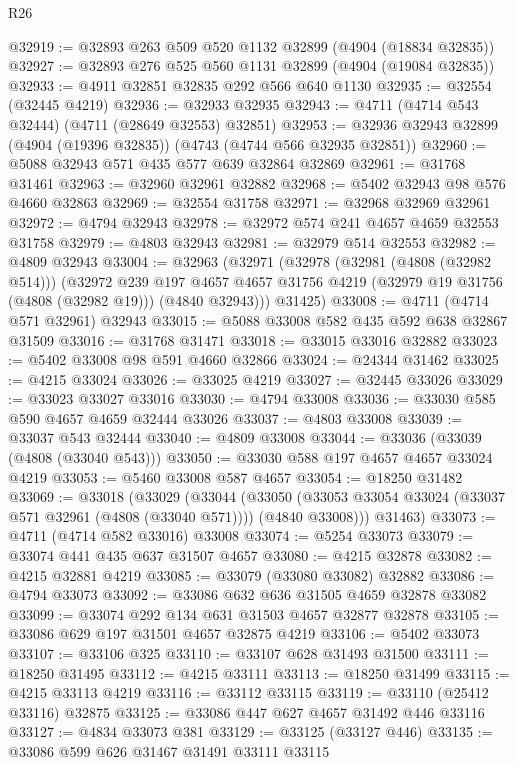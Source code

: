 \begin{lexlean}{R26}
\begin{coremodule}
@32919 := @32893 @263 @509 @520 @1132 @32899 (@4904 (@18834 @32835))
@32927 := @32893 @276 @525 @560 @1131 @32899 (@4904 (@19084 @32835))
@32933 := @4911 @32851 @32835 @292 @566 @640 @1130
@32935 := @32554 (@32445 @4219)
@32936 := @32933 @32935
@32943 := @4711 (@4714 @543 @32444) (@4711 (@28649 @32553) @32851)
@32953 := @32936 @32943 @32899 (@4904 (@19396 @32835)) (@4743 (@4744 @566 @32935 @32851))
@32960 := @5088 @32943 @571 @435 @577 @639 @32864 @32869
@32961 := @31768 @31461
@32963 := @32960 @32961 @32882
@32968 := @5402 @32943 @98 @576 @4660 @32863
@32969 := @32554 @31758
@32971 := @32968 @32969 @32961
@32972 := @4794 @32943
@32978 := @32972 @574 @241 @4657 @4659 @32553 @31758
@32979 := @4803 @32943
@32981 := @32979 @514 @32553
@32982 := @4809 @32943
@33004 := @32963
    (@32971
      (@32978
        (@32981 (@4808 (@32982 @514)))
        (@32972
          @239
          @197
          @4657
          @4657
          @31756
          @4219
          (@32979 @19 @31756 (@4808 (@32982 @19)))
          (@4840 @32943)))
      @31425)
@33008 := @4711 (@4714 @571 @32961) @32943
@33015 := @5088 @33008 @582 @435 @592 @638 @32867 @31509
@33016 := @31768 @31471
@33018 := @33015 @33016 @32882
@33023 := @5402 @33008 @98 @591 @4660 @32866
@33024 := @24344 @31462
@33025 := @4215 @33024
@33026 := @33025 @4219
@33027 := @32445 @33026
@33029 := @33023 @33027 @33016
@33030 := @4794 @33008
@33036 := @33030 @585 @590 @4657 @4659 @32444 @33026
@33037 := @4803 @33008
@33039 := @33037 @543 @32444
@33040 := @4809 @33008
@33044 := @33036 (@33039 (@4808 (@33040 @543)))
@33050 := @33030 @588 @197 @4657 @4657 @33024 @4219
@33053 := @5460 @33008 @587 @4657
@33054 := @18250 @31482
@33069 := @33018
    (@33029
      (@33044
        (@33050 (@33053 @33054 @33024 (@33037 @571 @32961 (@4808 (@33040 @571)))) (@4840 @33008)))
      @31463)
@33073 := @4711 (@4714 @582 @33016) @33008
@33074 := @5254 @33073
@33079 := @33074 @441 @435 @637 @31507 @4657
@33080 := @4215 @32878
@33082 := @4215 @32881 @4219
@33085 := @33079 (@33080 @33082) @32882
@33086 := @4794 @33073
@33092 := @33086 @632 @636 @31505 @4659 @32878 @33082
@33099 := @33074 @292 @134 @631 @31503 @4657 @32877 @32878
@33105 := @33086 @629 @197 @31501 @4657 @32875 @4219
@33106 := @5402 @33073
@33107 := @33106 @325
@33110 := @33107 @628 @31493 @31500
@33111 := @18250 @31495
@33112 := @4215 @33111
@33113 := @18250 @31499
@33115 := @4215 @33113 @4219
@33116 := @33112 @33115
@33119 := @33110 (@25412 @33116) @32875
@33125 := @33086 @447 @627 @4657 @31492 @446 @33116
@33127 := @4834 @33073 @381
@33129 := @33125 (@33127 @446)
@33135 := @33086 @599 @626 @31467 @31491 @33111 @33115

\end{coremodule}
\end{lexlean}
